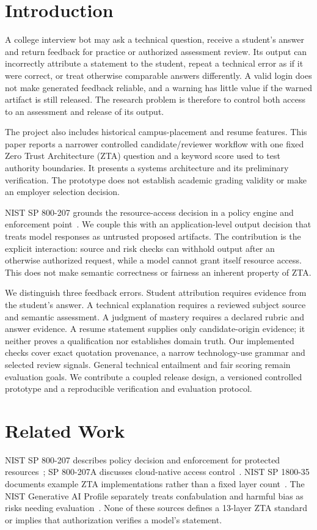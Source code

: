 \documentclass[conference]{IEEEtran}
\begin{document}
\section{Introduction}
A college interview bot may ask a technical question, receive a student's answer and return feedback for practice or authorized assessment review. Its output can incorrectly attribute a statement to the student, repeat a technical error as if it were correct, or treat otherwise comparable answers differently. A valid login does not make generated feedback reliable, and a warning has little value if the warned artifact is still released. The research problem is therefore to control both access to an assessment and release of its output.

The project also includes historical campus-placement and resume features. This paper reports a narrower controlled candidate/reviewer workflow with one fixed Zero Trust Architecture (ZTA) question and a keyword score used to test authority boundaries. It presents a systems architecture and its preliminary verification. The prototype does not establish academic grading validity or make an employer selection decision.

NIST SP 800-207 grounds the resource-access decision in a policy engine and enforcement point~\cite{rose2020zero}. We couple this with an application-level output decision that treats model responses as untrusted proposed artifacts. The contribution is the explicit interaction: source and risk checks can withhold output after an otherwise authorized request, while a model cannot grant itself resource access. This does not make semantic correctness or fairness an inherent property of ZTA.

We distinguish three feedback errors. Student attribution requires evidence from the student's answer. A technical explanation requires a reviewed subject source and semantic assessment. A judgment of mastery requires a declared rubric and answer evidence. A resume statement supplies only candidate-origin evidence; it neither proves a qualification nor establishes domain truth. Our implemented checks cover exact quotation provenance, a narrow technology-use grammar and selected review signals. General technical entailment and fair scoring remain evaluation goals. We contribute a coupled release design, a versioned controlled prototype and a reproducible verification and evaluation protocol.

\section{Related Work}
NIST SP 800-207 describes policy decision and enforcement for protected resources~\cite{rose2020zero}; SP 800-207A discusses cloud-native access control~\cite{chandramouli2023zero}. NIST SP 1800-35 documents example ZTA implementations rather than a fixed layer count~\cite{nist2025implementation}. The NIST Generative AI Profile separately treats confabulation and harmful bias as risks needing evaluation~\cite{nist2024genai}. None of these sources defines a 13-layer ZTA standard or implies that authorization verifies a model's statement.
\end{document}
